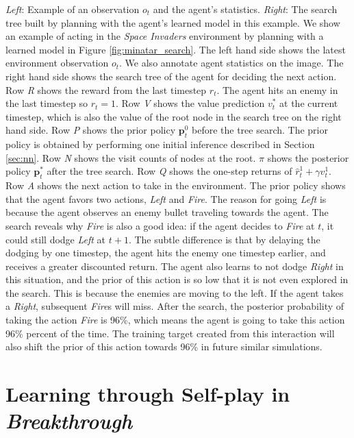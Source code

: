 {
    \textit{Left}: Example of an observation \(o_t\) and the agent's statistics.
    \textit{Right}: The search tree built by planning with the agent's learned model in this example.
}
We show an example of \moozi acting in the \textit{Space Invaders} environment by planning with a learned model in Figure \ref{fig:minatar_search}.
The left hand side shows the latest environment observation $o_t$.
We also annotate agent statistics on the image.
The right hand side shows the search tree of the agent for deciding the next action.
Row \textit{R} shows the reward from the last timestep $r_t$.
The agent hits an enemy in the last timestep so $r_t = 1$.
Row \textit{V} shows the value prediction $v_t^{*}$ at the current timestep, which is also the value of the root node in the search tree on the right hand side.
Row \textit{P} shows the prior policy $\mathbf{p}^0_t$ before the tree search.
The prior policy is obtained by performing one initial inference described in Section \ref{sec:nn}.
Row \textit{N} shows the visit counts of nodes at the root.
\(\pi\) shows the posterior policy $\mathbf{p}^*_t$ after the tree search.
Row \textit{Q} shows the one-step returns of  \(\hat{r}_t^1 + \gamma v_t^1\).
Row \textit{A} shows the next action to take in the environment.
The prior policy shows that the agent favors two actions, \textit{Left} and \textit{Fire}.
The reason for going \textit{Left} is because the agent observes an enemy bullet traveling towards the agent.
The search reveals why \textit{Fire} is also a good idea: if the agent decides to \textit{Fire} at $t$, it could still dodge \textit{Left} at $t+1$.
The subtle difference is that by delaying the dodging by one timestep, the agent hits the enemy one timestep earlier, and receives a greater discounted return.
The agent also learns to not dodge \textit{Right} in this situation, and the prior of this action is so low that it is not even explored in the search.
This is because the enemies are moving to the left.
If the agent takes a \textit{Right}, subsequent \textit{Fire}s will miss.
After the search, the posterior probability of taking the action \textit{Fire} is 96\%, which means the agent is going to take this action 96\% percent of the time.
The training target created from this interaction will also shift the prior of this action towards 96\% in future similar simulations.


\section{Learning through Self-play in \textit{Breakthrough}} \label{sec:exp:breakthrough}

